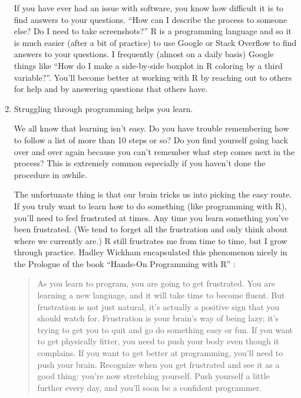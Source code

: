\documentclass[]{tufte-book}
\begin{document}
\begin{enumerate}
  If you have ever had an issue with software, you know how difficult it
  is to find answers to your questions. ``How can I describe the process
  to someone else? Do I need to take screenshots?'' R is a programming
  language and so it is much easier (after a bit of practice) to use
  Google or Stack Overflow to find answers to your questions. I
  frequently (almost on a daily basis) Google things like ``How do I
  make a side-by-side boxplot in R coloring by a third variable?''.
  You'll become better at working with R by reaching out to others for
  help and by answering questions that others have.
\item
  Struggling through programming helps you learn.

  We all know that learning isn't easy. Do you have trouble remembering
  how to follow a list of more than 10 steps or so? Do you find yourself
  going back over and over again because you can't remember what step
  comes next in the process? This is extremely common especially if you
  haven't done the procedure in awhile.

  The unfortunate thing is that our brain tricks us into picking the
  easy route. If you truly want to learn how to do something (like
  programming with R), you'll need to feel frustrated at times. Any time
  you learn something you've been frustrated. (We tend to forget all the
  frustration and only think about where we currently are.) R still
  frustrates me from time to time, but I grow through practice. Hadley
  Wickham encapsulated this phenomenon nicely in the Prologue of the
  book ``Hands-On Programming with R'' \citep{handson2014}:

  \begin{quote}
  As you learn to program, you are going to get frustrated. You are
  learning a new language, and it will take time to become fluent. But
  frustration is not just natural, it's actually a positive sign that
  you should watch for. Frustration is your brain's way of being lazy;
  it's trying to get you to quit and go do something easy or fun. If you
  want to get physically fitter, you need to push your body even though
  it complains. If you want to get better at programming, you'll need to
  push your brain. Recognize when you get frustrated and see it as a
  good thing: you're now stretching yourself. Push yourself a little
  further every day, and you'll soon be a confident programmer.
  \end{quote}
\end{enumerate}
\end{document}
